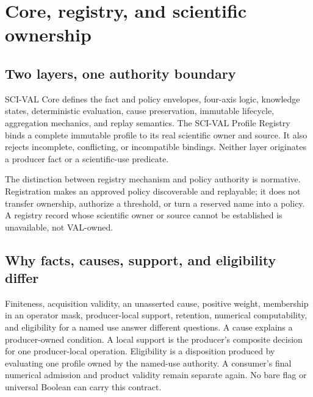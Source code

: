 \section{Core, registry, and scientific ownership}
\label{sec:definitions}

\subsection{Two layers, one authority boundary}

SCI-VAL Core defines the fact and policy envelopes, four-axis logic,
knowledge states, deterministic evaluation, cause preservation, immutable
lifecycle, aggregation mechanics, and replay semantics. The SCI-VAL Profile
Registry binds a complete immutable profile to its real scientific owner and
source. It also rejects incomplete, conflicting, or incompatible bindings.
Neither layer originates a producer fact or a scientific-use predicate.

The distinction between registry mechanism and policy authority is
normative. Registration makes an approved policy discoverable and replayable;
it does not transfer ownership, authorize a threshold, or turn a reserved
name into a policy. A registry record whose scientific owner or source cannot
be established is unavailable, not VAL-owned.

\subsection{Why facts, causes, support, and eligibility differ}

Finiteness, acquisition validity, an unasserted cause, positive weight,
membership in an operator mask, producer-local support, retention, numerical
computability, and eligibility for a named use answer different questions. A
cause explains a producer-owned condition. A local support is the producer's
composite decision for one producer-local operation. Eligibility is a
disposition produced by evaluating one profile owned by the named-use
authority. A consumer's final numerical admission and product validity remain
separate again. No bare flag or universal Boolean can carry this contract.

